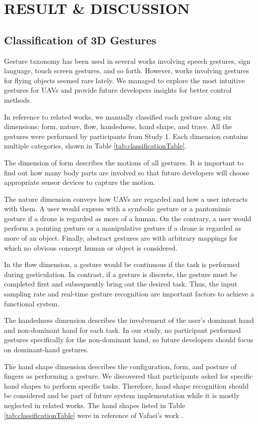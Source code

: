 \documentclass{sigchi}
\begin{document}
\section{RESULT \& DISCUSSION}

\subsection{Classification of 3D Gestures}
Gesture taxonomy has been used in several works involving speech gestures, sign language, touch screen gestures, and so forth. However, works involving gestures for flying objects seemed rare lately. We managed to explore the most intuitive gestures for UAVs and provide future developers insights for better control methods.

In reference to related works, we manually classified each gesture along six dimensions: form, nature, flow, handedness, hand shape, and trace. All the gestures were performed by participants from Study 1. Each dimension contains multiple categories, shown in Table \ref{tab:classificationTable}.

The dimension of form describes the motions of all gestures. It is important to find out how many body parts are involved so that future developers will choose appropriate sensor devices to capture the motion.

The nature dimension conveys how UAVs are regarded and how a user interacts with them. A user would express with a symbolic gesture or a pantomimic gesture if a drone is regarded as more of a human. On the contrary, a user would perform a pointing gesture or a manipulative gesture if a drone is regarded as more of an object. Finally, abstract gestures are with arbitrary mappings for which no obvious concept human or object is considered.

In the flow dimension, a gesture would be continuous if the task is performed during gesticulation. In contrast, if a gesture is discrete, the gesture must be completed first and subsequently bring out the desired task. Thus, the input sampling rate and real-time gesture recognition are important factors to achieve a functional system.

The handedness dimension describes the involvement of the user's dominant hand and non-dominant hand for each task. In our study, no participant performed gestures specifically for the non-dominant hand, so future developers should focus on dominant-hand gestures.

The hand shape dimension describes the configuration, form, and posture of fingers as performing a gesture. We discovered that participants asked for specific hand shapes to perform specific tasks. Therefore, hand shape recognition should be considered and be part of future system implementation while it is mostly neglected in related works. The hand shapes listed in Table \ref{tab:classificationTable} were in reference of Vafaei's work \cite{Vafaei:2013}.
\end{document}
